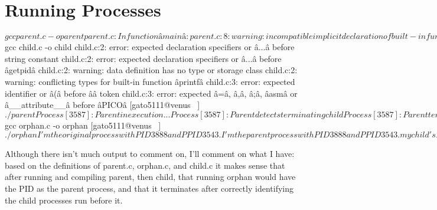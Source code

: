 \documentclass[12pt]{book}
\newenvironment{code}{ \verbatimtab  }{ \endverbatimtab }
\begin{document}
\section{Running Processes}
\begin{code}
[gato5111@venus ~]$ gcc parent.c -o parent
parent.c: In function âmainâ:
parent.c:8: warning: incompatible implicit declaration of built-in function âexitâ
parent.c:11: warning: incompatible implicit declaration of built-in function âprintfâ
[gato5111@venus ~]$ gcc child.c -o child
child.c:2: error: expected declaration specifiers or â...â before string constant
child.c:2: error: expected declaration specifiers or â...â before âgetpidâ
child.c:2: warning: data definition has no type or storage class
child.c:2: warning: conflicting types for built-in function âprintfâ
child.c:3: error: expected identifier or â(â before â}â token
child.c:3: error: expected â=â, â,â, â;â, âasmâ or â__attribute__â before âPICOâ
[gato5111@venus ~]$ ./parent
Process[3587]: Parent in execution ...
Process[3587]: Parent detects terminating child
Process[3587]: Parent terminating ...
[gato5111@venus ~]$ gcc orphan.c -o orphan
[gato5111@venus ~]$ ./orphan
I'm the original process with PID 3888 and PPID 3543.
I'm the parent process with PID 3888 and PPID 3543.
my child's PID 3889
PID 3888 terminates.
[gato5111@venus ~]$
\end{code}

Although there isn't much output to comment on, I'll comment on what I have: based on the definitions of parent.c, orphan.c, and child.c it makes sense that after running and compiling parent, then child, that running orphan would have the PID as the parent process, and that it terminates after correctly identifying the child processes run before it. 
\end{document}
